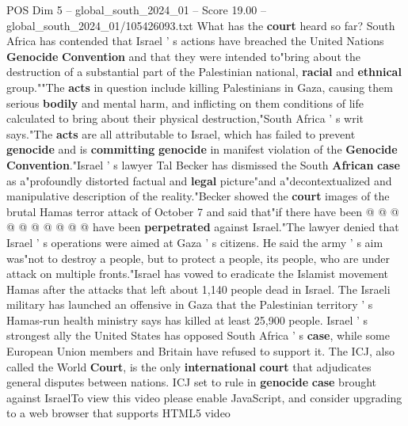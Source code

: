 \begin{textsample}{POS Dim 5 – global\_south\_2024\_01 – Score 19.00 – global\_south\_2024\_01/105426093.txt}
What has the \textbf{court} heard so far?
South Africa has contended that Israel ' s actions have breached the United Nations \textbf{Genocide} \textbf{Convention} and that they were intended to"bring about the destruction of a substantial part of the Palestinian national, \textbf{racial} and \textbf{ethnical} group.""The \textbf{acts} in question include killing Palestinians in Gaza, causing them serious \textbf{bodily} and mental harm, and inflicting on them conditions of life calculated to bring about their physical destruction,"South Africa ' s writ says."The \textbf{acts} are all attributable to Israel, which has failed to prevent \textbf{genocide} and is \textbf{committing} \textbf{genocide} in manifest violation of the \textbf{Genocide} \textbf{Convention}."Israel ' s lawyer Tal Becker has dismissed the South \textbf{African} \textbf{case} as a"profoundly distorted factual and \textbf{legal} picture"and a"decontextualized and manipulative description of the reality."Becker showed the \textbf{court} images of the brutal Hamas terror attack of October 7 and said that"if there have been @ @ @ @ @ @ @ @ @ @ have been \textbf{perpetrated} against Israel."The lawyer denied that Israel ' s operations were aimed at Gaza ' s citizens.
He said the army ' s aim was"not to destroy a people, but to protect a people, its people, who are under attack on multiple fronts."Israel has vowed to eradicate the Islamist movement Hamas after the attacks that left about 1,140 people dead in Israel.
The Israeli military has launched an offensive in Gaza that the Palestinian territory ' s Hamas-run health ministry says has killed at least 25,900 people.
Israel ' s strongest ally the United States has opposed South Africa ' s \textbf{case}, while some European Union members and Britain have refused to support it.
The ICJ, also called the World \textbf{Court}, is the only \textbf{international} \textbf{court} that adjudicates general disputes between nations.
ICJ set to rule in \textbf{genocide} \textbf{case} brought against IsraelTo view this video please enable JavaScript, and consider upgrading to a web browser that supports HTML5 video

\end{textsample}
